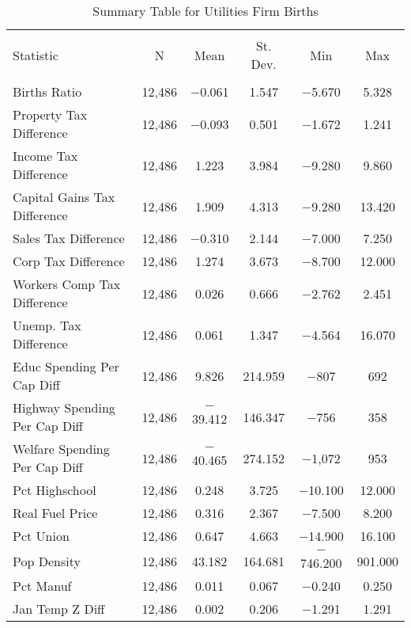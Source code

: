 
\begin{table}[!htbp] \centering 
  \caption{Summary Table for  Utilities Firm Births} 
  \label{22summary} 
\begin{tabular}{@{\extracolsep{5pt}}lccccc} 
\\[-1.8ex]\hline 
\hline \\[-1.8ex] 
Statistic & \multicolumn{1}{c}{N} & \multicolumn{1}{c}{Mean} & \multicolumn{1}{c}{St. Dev.} & \multicolumn{1}{c}{Min} & \multicolumn{1}{c}{Max} \\ 
\hline \\[-1.8ex] 
Births Ratio & 12,486 & $-$0.061 & 1.547 & $-$5.670 & 5.328 \\ 
Property Tax Difference & 12,486 & $-$0.093 & 0.501 & $-$1.672 & 1.241 \\ 
Income Tax Difference & 12,486 & 1.223 & 3.984 & $-$9.280 & 9.860 \\ 
Capital Gains Tax Difference & 12,486 & 1.909 & 4.313 & $-$9.280 & 13.420 \\ 
Sales Tax Difference & 12,486 & $-$0.310 & 2.144 & $-$7.000 & 7.250 \\ 
Corp Tax Difference & 12,486 & 1.274 & 3.673 & $-$8.700 & 12.000 \\ 
Workers Comp Tax Difference & 12,486 & 0.026 & 0.666 & $-$2.762 & 2.451 \\ 
Unemp. Tax Difference & 12,486 & 0.061 & 1.347 & $-$4.564 & 16.070 \\ 
Educ Spending Per Cap Diff & 12,486 & 9.826 & 214.959 & $-$807 & 692 \\ 
Highway Spending Per Cap Diff & 12,486 & $-$39.412 & 146.347 & $-$756 & 358 \\ 
Welfare Spending Per Cap Diff & 12,486 & $-$40.465 & 274.152 & $-$1,072 & 953 \\ 
Pct Highschool & 12,486 & 0.248 & 3.725 & $-$10.100 & 12.000 \\ 
Real Fuel Price & 12,486 & 0.316 & 2.367 & $-$7.500 & 8.200 \\ 
Pct Union & 12,486 & 0.647 & 4.663 & $-$14.900 & 16.100 \\ 
Pop Density & 12,486 & 43.182 & 164.681 & $-$746.200 & 901.000 \\ 
Pct Manuf & 12,486 & 0.011 & 0.067 & $-$0.240 & 0.250 \\ 
Jan Temp Z Diff & 12,486 & 0.002 & 0.206 & $-$1.291 & 1.291 \\ 

\end{tabular}
\end{table}

